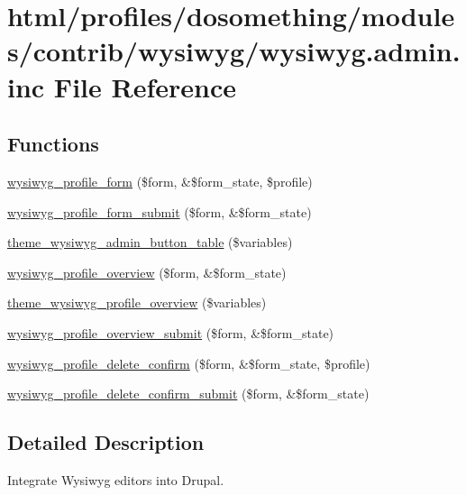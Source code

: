 \hypertarget{wysiwyg_8admin_8inc}{
\section{html/profiles/dosomething/modules/contrib/wysiwyg/wysiwyg.admin.inc File Reference}
\label{wysiwyg_8admin_8inc}
}
\subsection*{Functions}
\begin{DoxyCompactItemize}
\item 
\hyperlink{wysiwyg_8admin_8inc_ace4bae87b031fd2ac18d20e909a3bc2c}{wysiwyg\_\-profile\_\-form} (\$form, \&\$form\_\-state, \$profile)
\item 
\hyperlink{wysiwyg_8admin_8inc_a50400446fc96a07ade71e4fb50e4045e}{wysiwyg\_\-profile\_\-form\_\-submit} (\$form, \&\$form\_\-state)
\item 
\hyperlink{wysiwyg_8admin_8inc_ac2aa4ee9e9dee5bb01e6f8aca083ee37}{theme\_\-wysiwyg\_\-admin\_\-button\_\-table} (\$variables)
\item 
\hyperlink{wysiwyg_8admin_8inc_a15781b5d635c8e4de52d215a050a2a82}{wysiwyg\_\-profile\_\-overview} (\$form, \&\$form\_\-state)
\item 
\hyperlink{wysiwyg_8admin_8inc_ac99b4c5557c02af041637448bc33ca98}{theme\_\-wysiwyg\_\-profile\_\-overview} (\$variables)
\item 
\hyperlink{wysiwyg_8admin_8inc_a4691b46fc31197d8e1772b9613afb0c5}{wysiwyg\_\-profile\_\-overview\_\-submit} (\$form, \&\$form\_\-state)
\item 
\hyperlink{wysiwyg_8admin_8inc_a1d93944846e778af94fd0d74ec4cabe3}{wysiwyg\_\-profile\_\-delete\_\-confirm} (\$form, \&\$form\_\-state, \$profile)
\item 
\hyperlink{wysiwyg_8admin_8inc_a892dad02712e978645e6eccc2f61b294}{wysiwyg\_\-profile\_\-delete\_\-confirm\_\-submit} (\$form, \&\$form\_\-state)
\end{DoxyCompactItemize}


\subsection{Detailed Description}
Integrate Wysiwyg editors into Drupal. 

